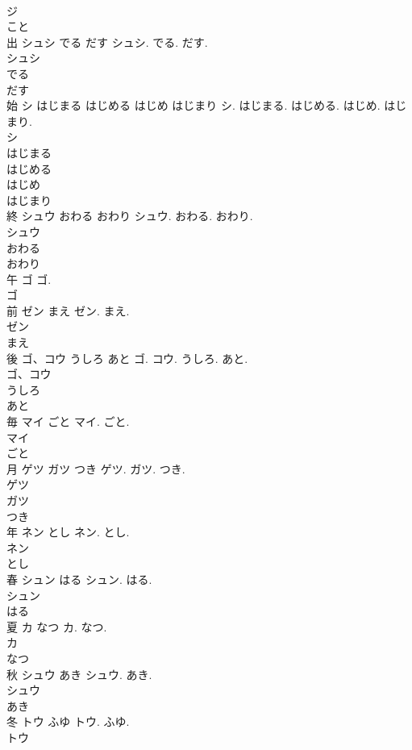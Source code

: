 \documentclass[8pt]{extreport}
\begin{document}
\begin{CJK}{UTF8}{min}
\\	ジ
\\	こと
\\	出	シュシ でる だす	シュシ. でる. だす.	
\\	シュシ
\\	でる
\\	だす
\\	始	シ はじまる はじめる はじめ はじまり	シ. はじまる. はじめる. はじめ. はじまり.	
\\	シ
\\	はじまる
\\	はじめる
\\	はじめ
\\	はじまり
\\	終	シュウ おわる おわり	シュウ. おわる. おわり.	
\\	シュウ
\\	おわる
\\	おわり
\\	午	ゴ	ゴ.	
\\	ゴ
\\	前	ゼン まえ	ゼン. まえ.	
\\	ゼン
\\	まえ
\\	後	ゴ、コウ うしろ あと	ゴ. コウ. うしろ. あと.	
\\	ゴ、コウ
\\	うしろ
\\	あと
\\	毎	マイ ごと	マイ. ごと.	
\\	マイ
\\	ごと
\\	月	ゲツ ガツ つき	ゲツ. ガツ. つき.	
\\	ゲツ
\\	ガツ
\\	つき
\\	年	ネン とし	ネン. とし.	
\\	ネン
\\	とし
\\	春	シュン はる	シュン. はる.	
\\	シュン
\\	はる
\\	夏	カ なつ	カ. なつ.	
\\	カ
\\	なつ
\\	秋	シュウ あき	シュウ. あき.	
\\	シュウ
\\	あき
\\	冬	トウ ふゆ	トウ. ふゆ.	
\\	トウ

\end{CJK}
\end{document}
